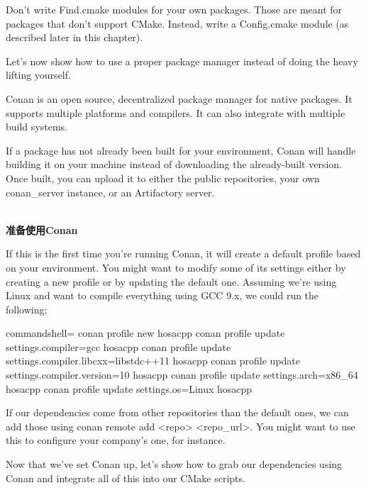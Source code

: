\begin{tcolorbox}[colback=blue!5!white,colframe=blue!75!black, title=Note]
\hspace*{0.7cm}Don't write Find\*.cmake modules for your own packages. Those are meant for packages that don't support CMake. Instead, write a Config\*.cmake module (as described later in this chapter).
\end{tcolorbox}

Let's now show how to use a proper package manager instead of doing the heavy lifting yourself.


Conan is an open source, decentralized package manager for native packages. It supports multiple platforms and compilers. It can also integrate with multiple build systems.

If a package has not already been built for your environment, Conan will handle building it on your machine instead of downloading the already-built version. Once built, you can upload it to either the public repositories, your own conan\_server instance, or an Artifactory server.

\hspace*{\fill} \\ %
\noindent
\textbf{准备使用Conan}

If this is the first time you're running Conan, it will create a default profile based on your environment. You might want to modify some of its settings either by creating a new profile or by updating the default one. Assuming we're using Linux and want to compile everything using GCC 9.x, we could run the following:

\begin{tcblisting}{commandshell={}}
conan profile new hosacpp
conan profile update settings.compiler=gcc hosacpp
conan profile update settings.compiler.libcxx=libstdc++11 hosacpp
conan profile update settings.compiler.version=10 hosacpp
conan profile update settings.arch=x86_64 hosacpp
conan profile update settings.os=Linux hosacpp
\end{tcblisting}

If our dependencies come from other repositories than the default ones, we can add those using conan remote add <repo> <repo\_url>. You might want to use this to configure your company's one, for instance.

Now that we've set Conan up, let's show how to grab our dependencies using Conan and integrate all of this into our CMake scripts.

